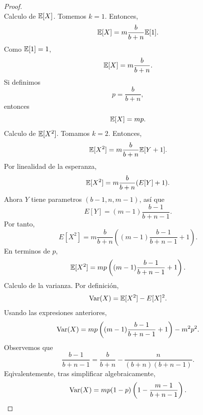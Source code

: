 \documentclass[12pt,a4paper]{article}
\newcommand{\paren}[1]{\left( #1 \right)}
\begin{document}
\begin{proof}
\begin{equation*}
        \end{equation*}
        Calculo de $\mathbb{E}[X]$. Tomemos $k=1$. Entonces,
        \begin{equation*}
            \mathbb{E}[X]=m\frac{b}{b+n}\mathbb{E}[1].
        \end{equation*}
        Como $\mathbb{E}[1]=1$,
        \begin{equation*}
            \mathbb{E}[X]=m\frac{b}{b+n}.
        \end{equation*}
        Si definimos
        \begin{equation*}
            p=\frac{b}{b+n},
        \end{equation*}
        entonces
        \begin{equation*}
            \mathbb{E}[X]=mp.
        \end{equation*}
        Calculo de $\mathbb{E}[X^{2}]$. Tomamos $k=2$. Entonces,
        \begin{equation*}
            \mathbb{E}[X^{2}]=m\frac{b}{b+n}\mathbb{E}[Y+1].
        \end{equation*}
        Por linealidad de la esperanza,
        \begin{equation*}
            \mathbb{E}[X^{2}]=m\frac{b}{b+n}(E[Y]+1).
        \end{equation*}
        Ahora $Y$ tiene parametros $(b-1,n,m-1)$, así que
        \begin{equation*}
            E[Y]=(m-1)\frac{b-1}{b+n-1}.
        \end{equation*}
        Por tanto,
        \begin{equation*}
            E[X^{2}]=m\frac{b}{b+n}\paren{(m-1)\frac{b-1}{b+n-1}+1}.
        \end{equation*}
        En terminos de $p$,
        \begin{equation*}
            \E[X^{2}]=mp\paren{(m-1)\frac{b-1}{b+n-1}+1}.
        \end{equation*}
        Calculo de la varianza. Por definición,
        \begin{equation*}
            \operatorname{Var}(X)=\mathbb{E}[X^{2}]-E[X]^{2}.
        \end{equation*}
        Usando las expresiones anteriores,
        \begin{equation*}
            \Var(X)=mp\paren{(m-1)\frac{b-1}{b+n-1}+1}-m^{2}p^{2}.
        \end{equation*}
        Observemos que
        \begin{equation*}
            \frac{b-1}{b+n-1}=\frac{b}{b+n}-\frac{n}{(b+n)(b+n-1)}.
        \end{equation*}
        Eqivalentemente, tras simplificar algebraicamente,
        \begin{equation*}
            \Var(X)=mp(1-p)\paren{1-\frac{m-1}{b+n-1}}.
        \end{equation*}
    \end{proof}
\end{document}
